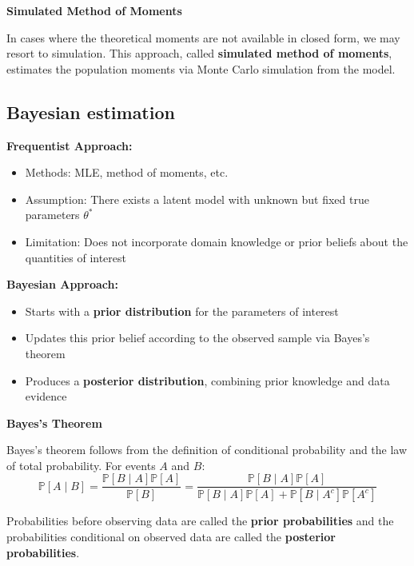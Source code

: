 \documentclass[12pt,a4paper]{article}
\begin{document}
\vspace{0.5em}

\textbf{Simulated Method of Moments}

In cases where the theoretical moments are not available in closed form, we may resort to simulation. This approach, called \textbf{simulated method of moments}, estimates the population moments via Monte Carlo simulation from the model.

\subsection{Bayesian estimation}

\textbf{Frequentist Approach:}
\begin{itemize}
    \item Methods: MLE, method of moments, etc.
    \item Assumption: There exists a latent model with unknown but fixed true parameters $\theta^*$
    \item Limitation: Does not incorporate domain knowledge or prior beliefs about the quantities of interest
\end{itemize}

\textbf{Bayesian Approach:}
\begin{itemize}
    \item Starts with a \textbf{prior distribution} for the parameters of interest
    \item Updates this prior belief according to the observed sample via Bayes's theorem
    \item Produces a \textbf{posterior distribution}, combining prior knowledge and data evidence
\end{itemize}

\vspace{0.5em}

\textbf{Bayes's Theorem}

Bayes's theorem follows from the definition of conditional probability and the law of total probability. For events $A$ and $B$:
\[
\mathbb{P}[A \mid B] = \frac{\mathbb{P}[B \mid A] \mathbb{P}[A]}{\mathbb{P}[B]} = \frac{\mathbb{P}[B \mid A] \mathbb{P}[A]}{\mathbb{P}[B \mid A] \mathbb{P}[A] + \mathbb{P}[B \mid A^c] \mathbb{P}[A^c]}
\]

Probabilities before observing data are called the \textbf{prior probabilities} and the probabilities conditional on observed data are called the \textbf{posterior probabilities}.

\vspace{0.5em}
\end{document}
